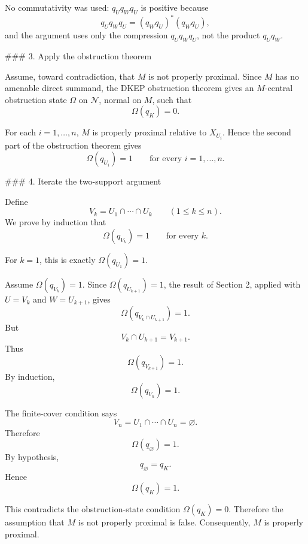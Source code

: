 No commutativity was used: \(q_Uq_Wq_U\) is positive because
\[
q_Uq_Wq_U=(q_Wq_U)^*(q_Wq_U),
\]
and the argument uses only the compression \(q_Uq_Wq_U\), not the product \(q_Uq_W\).

### 3. Apply the obstruction theorem

Assume, toward contradiction, that \(M\) is not properly proximal. Since \(M\) has no amenable direct summand, the DKEP obstruction theorem gives an \(M\)-central obstruction state \(\Omega\) on \(\mathcal N\), normal on \(M\), such that
\[
\Omega(q_K)=0.
\]

For each \(i=1,\dots,n\), \(M\) is properly proximal relative to \(X_{U_i}\). Hence the second part of the obstruction theorem gives
\[
\Omega(q_{U_i})=1
\qquad\text{for every }i=1,\dots,n.
\]

### 4. Iterate the two-support argument

Define
\[
V_k=U_1\cap\cdots\cap U_k
\qquad (1\le k\le n).
\]
We prove by induction that
\[
\Omega(q_{V_k})=1
\qquad\text{for every }k.
\]

For \(k=1\), this is exactly \(\Omega(q_{U_1})=1\).

Assume \(\Omega(q_{V_k})=1\). Since \(\Omega(q_{U_{k+1}})=1\), the result of Section 2, applied with \(U=V_k\) and \(W=U_{k+1}\), gives
\[
\Omega(q_{V_k\cap U_{k+1}})=1.
\]
But
\[
V_k\cap U_{k+1}=V_{k+1}.
\]
Thus
\[
\Omega(q_{V_{k+1}})=1.
\]
By induction,
\[
\Omega(q_{V_n})=1.
\]

The finite-cover condition says
\[
V_n=U_1\cap\cdots\cap U_n=\varnothing.
\]
Therefore
\[
\Omega(q_{\varnothing})=1.
\]
By hypothesis,
\[
q_{\varnothing}=q_K.
\]
Hence
\[
\Omega(q_K)=1.
\]

This contradicts the obstruction-state condition \(\Omega(q_K)=0\). Therefore the assumption that \(M\) is not properly proximal is false. Consequently, \(M\) is properly proximal.